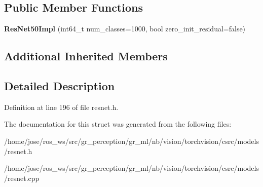 \subsection*{Public Member Functions}
\begin{DoxyCompactItemize}
\item 
\mbox{\label{structvision_1_1models_1_1ResNet50Impl_ad279533700b09ba6e521f8e05fe6a364}} 
{\bfseries Res\+Net50\+Impl} (int64\+\_\+t num\+\_\+classes=1000, bool zero\+\_\+init\+\_\+residual=false)
\end{DoxyCompactItemize}
\subsection*{Additional Inherited Members}


\subsection{Detailed Description}


Definition at line 196 of file resnet.\+h.



The documentation for this struct was generated from the following files\+:\begin{DoxyCompactItemize}
\item 
/home/jose/ros\+\_\+ws/src/gr\+\_\+perception/gr\+\_\+ml/nb/vision/torchvision/csrc/models/resnet.\+h\item 
/home/jose/ros\+\_\+ws/src/gr\+\_\+perception/gr\+\_\+ml/nb/vision/torchvision/csrc/models/resnet.\+cpp\end{DoxyCompactItemize}
